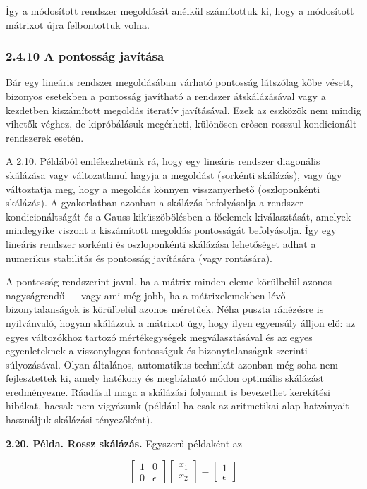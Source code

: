 \documentclass[
  magyar,
  11pt]{article}
\begin{document}
Így a módosított rendszer megoldását anélkül számítottuk ki, hogy a
módosított mátrixot újra felbontottuk volna.

\subsubsection{2.4.10 A pontosság
javítása}\label{a-pontossuxe1g-javuxedtuxe1sa}

Bár egy lineáris rendszer megoldásában várható pontosság látszólag kőbe
vésett, bizonyos esetekben a pontosság javítható a rendszer
átskálázásával vagy a kezdetben kiszámított megoldás iteratív
javításával. Ezek az eszközök nem mindig vihetők véghez, de kipróbálásuk
megérheti, különösen erősen rosszul kondicionált rendszerek esetén.

A 2.10. Példából emlékezhetünk rá, hogy egy lineáris rendszer diagonális
skálázása vagy változatlanul hagyja a megoldást (sorkénti skálázás),
vagy úgy változtatja meg, hogy a megoldás könnyen visszanyerhető
(oszloponkénti skálázás). A gyakorlatban azonban a skálázás befolyásolja
a rendszer kondicionáltságát és a Gauss-kiküszöbölésben a főelemek
kiválasztását, amelyek mindegyike viszont a kiszámított megoldás
pontosságát befolyásolja. Így egy lineáris rendszer sorkénti és
oszloponkénti skálázása lehetőséget adhat a numerikus stabilitás és
pontosság javítására (vagy rontására).

A pontosság rendszerint javul, ha a mátrix minden eleme körülbelül
azonos nagyságrendű --- vagy ami még jobb, ha a mátrixelemekben lévő
bizonytalanságok is körülbelül azonos méretűek. Néha puszta ránézésre is
nyilvánvaló, hogyan skálázzuk a mátrixot úgy, hogy ilyen egyensúly
álljon elő: az egyes változókhoz tartozó mértékegységek megválasztásával
és az egyes egyenleteknek a viszonylagos fontosságuk és bizonytalanságuk
szerinti súlyozásával. Olyan általános, automatikus technikát azonban
még soha nem fejlesztettek ki, amely hatékony és megbízható módon
optimális skálázást eredményezne. Ráadásul maga a skálázási folyamat is
bevezethet kerekítési hibákat, hacsak nem vigyázunk (például ha csak az
aritmetikai alap hatványait használjuk skálázási tényezőként).

\textbf{2.20. Példa. Rossz skálázás.} Egyszerű példaként az

\[\begin{bmatrix} 1 & 0 \\ 0 & \epsilon \end{bmatrix} \begin{bmatrix} x_1 \\ x_2 \end{bmatrix} = \begin{bmatrix} 1 \\ \epsilon \end{bmatrix}\]
\end{document}
